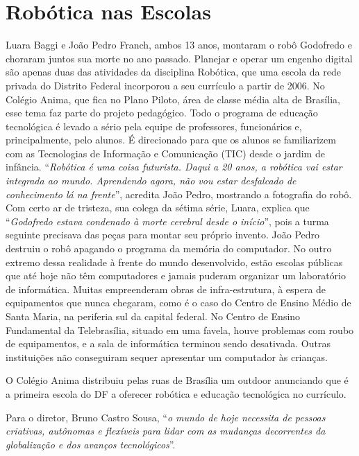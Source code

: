     \section{Robótica nas Escolas}
    Luara Baggi e João Pedro Franch, ambos 13 anos, montaram o robô
    Godofredo e choraram juntos sua morte no ano passado. Planejar e operar
    um engenho digital são apenas duas das atividades da disciplina
    Robótica, que uma escola da rede privada do Distrito Federal incorporou
    a seu currículo a partir de 2006. No Colégio Anima, que fica no
    Plano Piloto, área de classe média alta de Brasília, esse tema faz parte do
    projeto pedagógico. Todo o programa de educação tecnológica é levado a
    sério pela equipe de professores, funcionários e, principalmente, pelo
    alunos. É direcionado para que os alunos se familiarizem com as
    Tecnologias de Informação e Comunicação (TIC) desde o jardim de
    infância. ``\emph{Robótica é uma coisa futurista. Daqui a 20 anos, a robótica
    vai estar integrada ao mundo. Aprendendo agora, não vou estar desfalcado
    de conhecimento lá na frente}'', acredita João Pedro, mostrando a
    fotografia do robô. Com certo ar de tristeza, sua colega da sétima
    série, Luara, explica que ``\emph{Godofredo estava condenado à morte cerebral
    desde o início}'', pois a turma seguinte precisava das peças para montar
    seu próprio invento. João Pedro destruiu o robô apagando o programa da
    memória do computador. No outro extremo dessa realidade à frente do
    mundo desenvolvido, estão escolas públicas que até hoje não têm
    computadores e jamais puderam organizar um laboratório de informática.
    Muitas empreenderam obras de infra-estrutura, à espera de equipamentos
    que nunca chegaram, como é o caso do Centro de Ensino Médio de Santa
    Maria, na periferia sul da capital federal. No Centro de Ensino
    Fundamental da Telebrasília, situado em uma favela, houve problemas com
    roubo de equipamentos, e a sala de informática terminou sendo
    desativada. Outras instituições não conseguiram sequer apresentar um
    computador às crianças.

    O Colégio Anima distribuiu pelas ruas de Brasília um outdoor anunciando
    que é a primeira escola do DF a oferecer robótica e educação tecnológica
    no currículo.

    Para o diretor, Bruno Castro Sousa, ``\emph{o mundo de hoje necessita de
    pessoas criativas, autônomas e flexíveis para lidar com as mudanças
    decorrentes da globalização e dos avanços tecnológicos}''.
